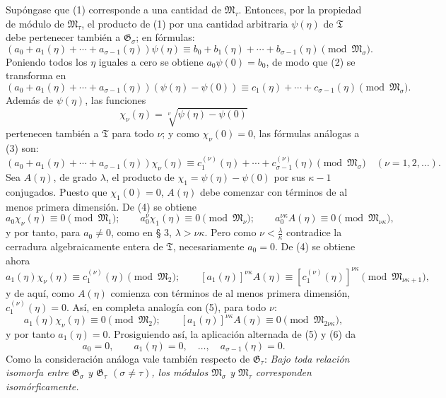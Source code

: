 \documentclass[11pt]{article}
\begin{document}
Supóngase que (1) corresponde a una cantidad de $\mathfrak M_\tau$. Entonces, por la propiedad de módulo de $\mathfrak M_\tau$, el producto de (1) por una cantidad arbitraria $\psi(\eta)$ de $\mathfrak T$ debe pertenecer también a $\mathfrak G_\sigma$; en fórmulas:
\begin{equation}
(a_0+a_1(\eta)+\cdots+a_{\sigma-1}(\eta))\psi(\eta)
\equiv b_0+b_1(\eta)+\cdots+b_{\sigma-1}(\eta)
\pmod{\mathfrak M_\sigma}.
\tag{2}
\end{equation}
Poniendo todos los $\eta$ iguales a cero se obtiene $a_0\psi(0)=b_0$, de modo que (2) se transforma en
\begin{equation}
(a_0+a_1(\eta)+\cdots+a_{\sigma-1}(\eta))(\psi(\eta)-\psi(0))
\equiv c_1(\eta)+\cdots+c_{\sigma-1}(\eta)
\pmod{\mathfrak M_\sigma}.
\tag{3}
\end{equation}
Además de $\psi(\eta)$, las funciones
\[
 \chi_\nu(\eta)=\sqrt[\nu]{\psi(\eta)-\psi(0)}
\]
pertenecen también a $\mathfrak T$ para todo $\nu$; y como $\chi_\nu(0)=0$, las fórmulas análogas a (3) son:
\begin{equation}
(a_0+a_1(\eta)+\cdots+a_{\sigma-1}(\eta))\chi_\nu(\eta)
\equiv c_1^{(\nu)}(\eta)+\cdots+c_{\sigma-1}^{(\nu)}(\eta)
\pmod{\mathfrak M_\sigma}
\quad(\nu=1,2,\ldots).
\tag{4}
\end{equation}
Sea $A(\eta)$, de grado $\lambda$, el producto de $\chi_1=\psi(\eta)-\psi(0)$ por sus $\kappa-1$ conjugados. Puesto que $\chi_1(0)=0$, $A(\eta)$ debe comenzar con términos de al menos primera dimensión. De (4) se obtiene
\begin{equation}
a_0\chi_\nu(\eta)\equiv0\pmod{\mathfrak M_1};\qquad
 a_0^\nu\chi_1(\eta)\equiv0\pmod{\mathfrak M_\nu};\qquad
 a_0^{\nu\kappa}A(\eta)\equiv0\pmod{\mathfrak M_{\nu\kappa}},
\tag{5}
\end{equation}
y por tanto, para $a_0\ne0$, como en § 3, $\lambda>\nu\kappa$. Pero como $\nu<\frac{\lambda}{\kappa}$ contradice la cerradura algebraicamente entera de $\mathfrak T$, necesariamente $a_0=0$. De (4) se obtiene ahora
\begin{equation}
a_1(\eta)\chi_\nu(\eta)\equiv c_1^{(\nu)}(\eta)\pmod{\mathfrak M_2};\qquad
[a_1(\eta)]^{\nu\kappa}A(\eta)
\equiv[c_1^{(\nu)}(\eta)]^{\nu\kappa}\pmod{\mathfrak M_{\nu\kappa+1}},
\tag{6}
\end{equation}
y de aquí, como $A(\eta)$ comienza con términos de al menos primera dimensión, $c_1^{(\nu)}(\eta)=0$. Así, en completa analogía con (5), para todo $\nu$:
\[
 a_1(\eta)\chi_\nu(\eta)\equiv0\pmod{\mathfrak M_2};\qquad
 [a_1(\eta)]^{\nu\kappa}A(\eta)\equiv0\pmod{\mathfrak M_{2\nu\kappa}},
\]
y por tanto $a_1(\eta)=0$. Prosiguiendo así, la aplicación alternada de (5) y (6) da
\[
 a_0=0,\qquad a_1(\eta)=0,\quad \ldots,\quad a_{\sigma-1}(\eta)=0.
\]
Como la consideración análoga vale también respecto de $\mathfrak G_\tau$: \emph{Bajo toda relación isomorfa entre $\mathfrak G_\sigma$ y $\mathfrak G_\tau$ $(\sigma\ne\tau)$, los módulos $\mathfrak M_\sigma$ y $\mathfrak M_\tau$ corresponden isomórficamente.}
\end{document}

